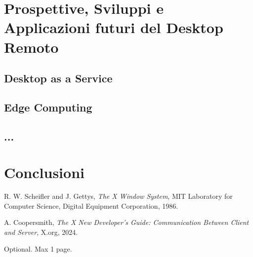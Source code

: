 \documentclass[12pt,a4paper,openright,twoside]{book}
\begin{document}
\chapter{Prospettive, Sviluppi e Applicazioni futuri del Desktop Remoto}

\section{Desktop as a Service}

\section{Edge Computing}

\section{...}

\chapter{Conclusioni}
\label{chap:conclusions}


\backmatter

\nocite{*} %




\begin{thebibliography}{9}
    R. W. Scheifler and J. Gettys, \textit{The X Window System}, MIT Laboratory for Computer Science, Digital Equipment Corporation, 1986.
    
    A. Coopersmith, \textit{The X New Developer’s Guide: Communication Between Client and Server}, X.org, 2024.
\end{thebibliography}
    

\begin{acknowledgements} %
Optional. Max 1 page.
\end{acknowledgements}
\end{document}
